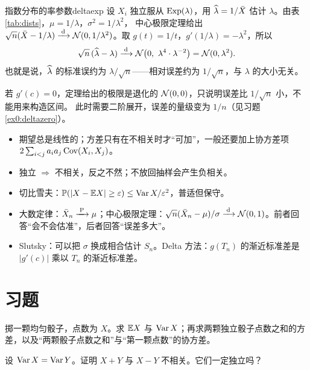 \begin{example}{指数分布的率参数}{deltaexp}
设 $X_i$ 独立服从 $\operatorname{Exp}(\lambda)$，用 $\widehat{\lambda}=1/\bar{X}$ 估计 $\lambda$。由表 \ref{tab:dists}，$\mu=1/\lambda$，$\sigma^2=1/\lambda^2$，
中心极限定理给出 $\sqrt n(\bar{X}-1/\lambda)\xrightarrow{\;\mathrm{d}\;}\mathcal{N}(0,1/\lambda^2)$。取 $g(t)=1/t$，$g'(1/\lambda)=-\lambda^2$，所以
\[
\sqrt n\,(\hatt\lambda-\lambda)\tod\N\big(0,\ \lambda^4\cdot\lambda^{-2}\big)=\N(0,\lambda^2).
\]
也就是说，$\widehat{\lambda}$ 的标准误约为 $\lambda/\sqrt n$——相对误差约为 $1/\sqrt n$，与 $\lambda$ 的大小无关。
\end{example}

\begin{warning}
若 $g'(c)=0$，定理给出的极限是退化的 $\mathcal{N}(0,0)$，只说明误差比 $1/\sqrt n$ 小，不能用来构造区间。
此时需要二阶展开，误差的量级变为 $1/n$（见习题 \ref{ex0:deltazero}）。
\end{warning}

\begin{summary}
\begin{itemize}
\item 期望总是线性的；方差只有在不相关时才“可加”，一般还要加上协方差项 $2\sum_{i<j}a_ia_j\operatorname{Cov}(X_i,X_j)$。
\item 独立 $\Rightarrow$ 不相关，反之不然；不放回抽样会产生负相关。
\item 切比雪夫：$\mathbb{P}(|X-\mathbb{E} X|\ge\varepsilon)\le\operatorname{Var} X/\varepsilon^2$，普适但保守。
\item 大数定律：$\bar{X}_n\xrightarrow{\;\mathrm{P}\;}\mu$；中心极限定理：$\sqrt n(\bar{X}_n-\mu)/\sigma\xrightarrow{\;\mathrm{d}\;}\mathcal{N}(0,1)$。前者回答“会不会估准”，后者回答“误差多大”。
\item Slutsky：可以把 $\sigma$ 换成相合估计 $S_n$。Delta 方法：$g(T_n)$ 的渐近标准差是 $|g'(c)|$ 乘以 $T_n$ 的渐近标准差。
\end{itemize}
\end{summary}

\section*{习题}

\levelA
\begin{exercise}
掷一颗均匀骰子，点数为 $X$。求 $\mathbb{E} X$ 与 $\operatorname{Var} X$；再求两颗独立骰子点数之和的方差，以及“两颗骰子点数之和”与“第一颗点数”的协方差。
\end{exercise}

\begin{exercise}
设 $\operatorname{Var} X=\operatorname{Var} Y$。证明 $X+Y$ 与 $X-Y$ 不相关。它们一定独立吗？
\end{exercise}

